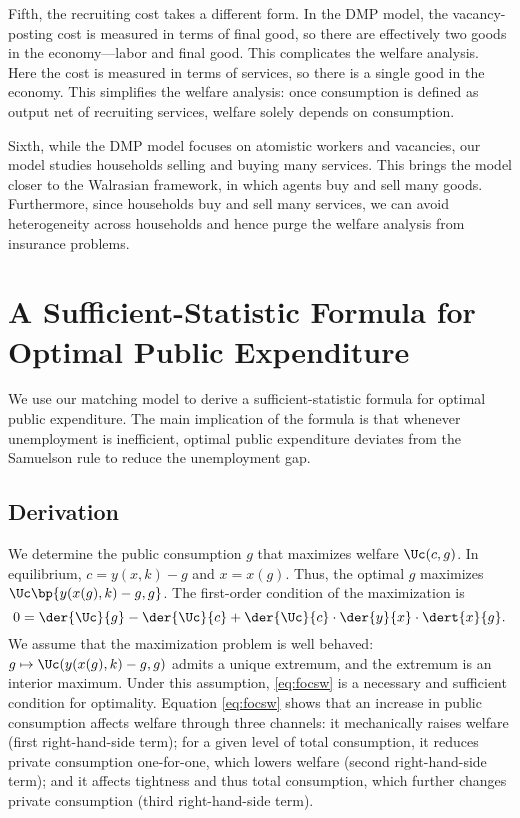 \documentclass[letterpaper,12pt,leqno]{article}
\begin{document}
\begin{bibunit}
Fifth, the recruiting cost takes a different form. In the DMP model, the vacancy-posting cost is measured in terms of final good, so there are effectively two goods in the economy---labor and final good. This complicates the welfare analysis. Here the cost is measured in terms of services, so there is a single good in the economy. This simplifies the welfare analysis: once consumption is defined as output net of recruiting services, welfare solely depends on consumption.

Sixth, while the DMP model focuses on atomistic workers and vacancies, our model studies households selling and buying many services. This brings the model closer to the Walrasian framework, in which agents buy and sell many goods. Furthermore, since households buy and sell many services, we can avoid heterogeneity across households and hence purge the welfare analysis from insurance problems.

\section{A Sufficient-Statistic Formula for Optimal Public Expenditure}\label{sec:formula}
 
We use our matching model to derive a sufficient-statistic formula for optimal public expenditure. The main implication of the formula is that whenever unemployment is inefficient, optimal public expenditure deviates from the Samuelson rule to reduce the unemployment gap.

\subsection{Derivation}\label{subsec:derivation}

We determine the public consumption $g$ that maximizes welfare $\Uc(c,g)$. In equilibrium, $c=y(x,k)-g$ and $x=x(g)$. Thus, the optimal $g$ maximizes $\Uc\bp{y(x(g),k)-g,g}$. The first-order condition of the maximization is
\begin{equation}
0=\der{\Uc}{g}-\der{\Uc}{c}+\der{\Uc}{c} \cdot \der{y}{x}\cdot \dert{x}{g}.
\label{eq:focsw}\end{equation}
We assume that the maximization problem is well behaved: $g\mapsto \Uc(y(x(g),k)-g,g)$ admits a unique extremum, and the extremum is an interior maximum. Under this assumption, \eqref{eq:focsw} is a necessary and sufficient condition for optimality. Equation \eqref{eq:focsw} shows that an increase in public consumption affects welfare through three channels: it mechanically raises welfare (first right-hand-side term); for a given level of total consumption, it reduces private consumption one-for-one, which lowers welfare (second right-hand-side term); and it affects tightness and thus total consumption, which further changes private consumption (third right-hand-side term). 


\end{bibunit}
\end{document}
